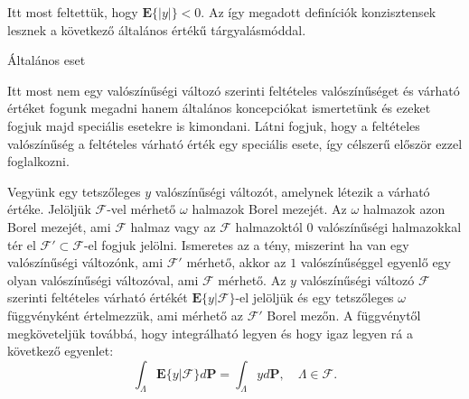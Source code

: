 \documentclass{article}
\begin{document}
Itt most feltettük, hogy $\mathrm{\textbf{E}}\{|y|\} < 0$. Az így megadott definíciók konzisztensek lesznek a következő általános értékű tárgyalásmóddal.
\begin{description}
	\item[Általános eset] 
\end{description}
Itt most nem egy valószínűségi változó szerinti feltételes valószínűséget és várható értéket fogunk megadni hanem általános koncepciókat ismertetünk és ezeket fogjuk majd speciális esetekre is kimondani. Látni fogjuk, hogy a feltételes valószínűség a feltételes várható érték egy speciális esete, így célszerű először ezzel foglalkozni.

Vegyünk egy tetszőleges $y$ valószínűségi változót, amelynek létezik a várható értéke. Jelöljük $\mathscr{F}$-vel mérhető $\omega$ halmazok Borel mezejét. Az $\omega$ halmazok azon Borel mezejét, ami $\mathscr{F}$ halmaz vagy az $\mathscr{F}$ halmazoktól $0$ valószínűségi halmazokkal tér el $\mathscr{F}' \subset \mathscr{F}$-el fogjuk jelölni. Ismeretes az a tény, miszerint ha van egy valószínűségi változónk, ami $\mathscr{F}'$ mérhető, akkor az $1$ valószínűséggel egyenlő egy olyan valószínűségi változóval, ami $\mathscr{F}$ mérhető. Az $y$ valószínűségi változó $\mathscr{F}$ szerinti feltételes várható értékét $\mathrm{\textbf{E}}\{y|\mathscr{F}\}$-el jelöljük és egy tetszőleges $\omega$ függvényként értelmezzük, ami mérhető az $\mathscr{F}'$ Borel mezőn. A függvénytől megköveteljük továbbá, hogy integrálható legyen és hogy igaz legyen rá a következő egyenlet: 
\begin{equation}
	\int_{\Lambda} \mathrm{\textbf{E}}\{y|\mathscr{F}\} d\mathrm{\textbf{P}} = \int_{\Lambda} y d\mathrm{\textbf{P}}, \quad \Lambda \in \mathscr{F}. 
	\label{eq:feltvv3}
\end{equation}
\end{document}
